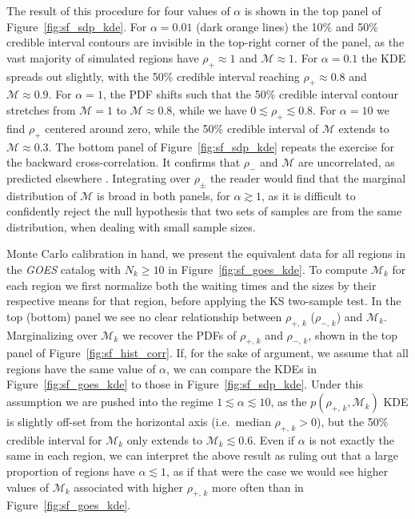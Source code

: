 The result of this procedure for four values of $\alpha$ is shown in the top panel of Figure~\ref{fig:sf_sdp_kde}. For $\alpha=0.01$ (dark orange lines) the 10\% and 50\% credible interval contours are invisible in the top-right corner of the panel, as the vast majority of simulated regions have $\rho_+ \approx 1$ and $\mathcal{M} \approx 1$. For $\alpha=0.1$ the KDE spreads out slightly, with the 50\% credible interval reaching $\rho_+\approx0.8$ and $\mathcal{M}\approx0.9$. For $\alpha=1$, the PDF shifts such that the 50\% credible interval contour stretches from $\mathcal{M} = 1$ to $\mathcal{M} \approx 0.8$, while we have $0 \lesssim \rho_+ \lesssim 0.8$. For $\alpha=10$ we find $\rho_+$ centered around zero, while the 50\% credible interval of $\mathcal{M}$ extends to $\mathcal{M} \approx 0.3$. The bottom panel of Figure~\ref{fig:sf_sdp_kde} repeats the exercise for the backward cross-correlation. It confirms that $\rho_-$ and $\mathcal{M}$ are uncorrelated, as predicted elsewhere \citep{Fulgenzi2017, Carlin2019quasi, Carlin2019ac}. Integrating over $\rho_{\pm}$ the reader would find that the marginal distribution of $\mathcal{M}$ is broad in both panels, for $\alpha \gtrsim 1$, as it is difficult to confidently reject the null hypothesis that two sets of samples are from the same distribution, when dealing with small sample sizes. 

Monte Carlo calibration in hand, we present the equivalent data for all regions in the \emph{GOES} catalog with $N_k \geq 10$ in Figure~\ref{fig:sf_goes_kde}. To compute $\mathcal{M}_k$ for each region we first normalize both the waiting times and the sizes by their respective means for that region, before applying the KS two-sample test. In the top (bottom) panel we see no clear relationship between $\rho_{+,\,k}$ ($\rho_{-,\,k}$) and $\mathcal{M}_k$. Marginalizing over $\mathcal{M}_k$ we recover the PDFs of $\rho_{+,\,k}$ and $\rho_{-,\,k}$, shown in the top panel of Figure~\ref{fig:sf_hist_corr}. If, for the sake of argument, we assume that all regions have the same value of $\alpha$, we can compare the KDEs in Figure~\ref{fig:sf_goes_kde} to those in Figure~\ref{fig:sf_sdp_kde}. Under this assumption we are pushed into the regime $1 \lesssim \alpha \lesssim 10$, as the $p(\rho_{+,\,k}, \mathcal{M}_k)$ KDE is slightly off-set from the horizontal axis (i.e.~median $\rho_{+,\,k} > 0$), but the 50\% credible interval for $\mathcal{M}_k$ only extends to $\mathcal{M}_k \lesssim 0.6$. Even if $\alpha$ is not exactly the same in each region, we can interpret the above result as ruling out that a large proportion of regions have $\alpha \lesssim 1$, as if that were the case we would see higher values of $\mathcal{M}_k$ associated with higher $\rho_{+,\,k}$ more often than in Figure~\ref{fig:sf_goes_kde}.

